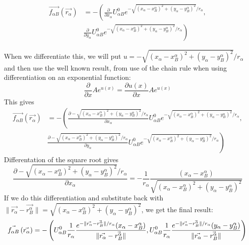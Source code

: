 \begin{itemize}
\begin{equation}
\begin{split}
\vec{f_{\alpha B}} \left( \vec{r_{\alpha}} \right) 
& =-\left( \frac{\partial}{\partial x_{\alpha}}U^0_{\alpha B} e^{-\sqrt{(x_{\alpha}-x^{\alpha}_{B})^2+(y_{\alpha}-y^{\alpha}_B)^2}/r_{\alpha} }\right. , \\
& \left. \frac{\partial}{\partial y_{\alpha}}U^0_{\alpha B} e^{-\sqrt{(x_{\alpha}-x^{\alpha}_{B})^2+(y_{\alpha}-y^{\alpha}_B)^2}/r_{\alpha} } \right)
\end{split}
\end{equation}

When we differentiate this, we will put $u=-\sqrt{(x_{\alpha}-x^{\alpha}_{B})^2+(y_{\alpha}-y^{\alpha}_B)^2} / r_{\alpha} $ and then use the well known result, from use of the chain rule when using differentiation on an exponential function:
\begin{equation}
\frac{\partial }{\partial x}Ae^{u(x)}=\frac{\partial u(x)}{\partial x}Ae^{u(x)}
\end{equation}
This gives
\begin{equation}
\begin{split}
    \vec{f_{\alpha B}} \left( \vec{r_{\alpha}} \right) 
 & =-\left( \frac{\partial -\sqrt{(x_{\alpha}-x^{\alpha}_{B})^2+(y_{\alpha}-y^{\alpha}_B)^2} / r_{\alpha}}{\partial  x_{\alpha}}U^0_{\alpha B} e^{-\sqrt{(x_{\alpha}-x^{\alpha}_{B})^2+(y_{\alpha}-y^{\alpha}_B)^2} / r_{\alpha} } \right. , \\
& \left. \frac{\partial -\sqrt{(x_{\alpha}-x^{\alpha}_{B})^2+(y_{\alpha}-y^{\alpha}_B)^2} / r_{\alpha}}{\partial y_{\alpha}}U^0_{\alpha B} e^{- \sqrt{(x_{\alpha}-x^{\alpha}_{B})^2+(y_{\alpha}-y^{\alpha}_B)^2} / r_{\alpha} } \right)
\end{split}
\end{equation}
Differentation of the square root gives 
\begin{equation}
 \frac{\partial -\sqrt{(x_{\alpha}-x^{\alpha}_{B})^2+(y_{\alpha}-y^{\alpha}_B)^2} / r_{\alpha}}{\partial x_{\alpha}} =-\frac{1}{r_{\alpha}}\frac{(x_{\alpha}-x_{B}^{\alpha})}{\sqrt{(x_{\alpha}-x^{\alpha}_{B})^2+(y_{\alpha}-y^{\alpha}_B)^2} }
\end{equation}
If we do this differentiation and substitute back with $\| \vec{r_{\alpha}} - \vec{r_{B}^{\alpha}} \|= \sqrt{(x_{\alpha}-x^{\alpha}_{B})^2+(y_{\alpha}-y^{\alpha}_B)^2}$, we get the final result:
\begin{equation}
    \vec{f_{\alpha B}} \left( \vec{r_{\alpha}} \right) 
=-\left(U^0_{\alpha B}\frac{1}{r_{\alpha}}\frac{e^{- \| \vec{r_{\alpha}} - \vec{r_{B}^{\alpha}} \| / r_{\alpha} } (x_{\alpha}-x_B^{\alpha})}{\| \vec{r_{\alpha}} - \vec{r_{B}^{\alpha}} \| },U^0_{\alpha B}\frac{1}{r_{\alpha}}\frac{e^{- \| \vec{r_{\alpha}} - \vec{r_{B}^{\alpha}} \| / r_{\alpha} } (y_{\alpha}-y_B^{\alpha})}{\| \vec{r_{\alpha}} - \vec{r_{B}^{\alpha}} \| }\right) \\
\end{equation}


\end{itemize}
